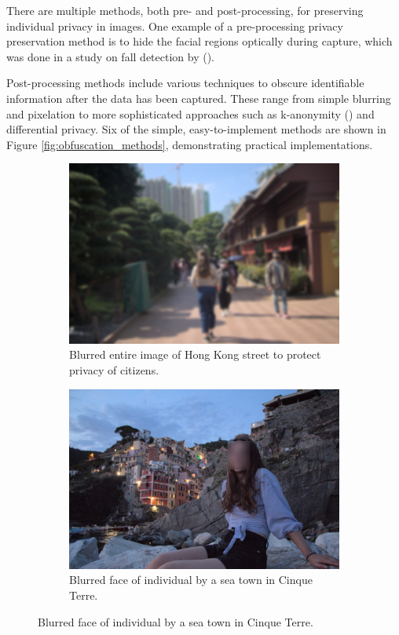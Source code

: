 There are multiple methods, both pre- and post-processing, for preserving individual privacy in images. One example of a pre-processing privacy preservation method is to hide the facial regions optically during capture, which was done in a study on fall detection by \citeauthor{wa2020elderly_fall_detection_meta} (\citeauthor{wa2020elderly_fall_detection_meta}).

Post-processing methods include various techniques to obscure identifiable information after the data has been captured. These range from simple blurring and pixelation to more sophisticated approaches such as k-anonymity (\cite{sw2002kAnonymity}) and differential privacy. Six of the simple, easy-to-implement methods are shown in Figure \ref{fig:obfuscation_methods}, demonstrating practical implementations.

\begin{figure}[H]
    \centering
    \begin{subfigure}{0.43\textwidth}
        \centering
        \includegraphics[width=\textwidth]{Images/Obfuscation/blurred_street.jpg}
        \caption{\centering Blurred entire image of Hong Kong street to protect privacy of citizens.}
    \end{subfigure}
    \hfill
    \begin{subfigure}{0.43\textwidth}
        \centering
        \includegraphics[width=1\textwidth]{Images/Obfuscation/face_blur.jpg}
        \caption{\centering Blurred face of individual by a sea town in Cinque Terre.}
    \end{subfigure}
    \newline


\end{figure}
